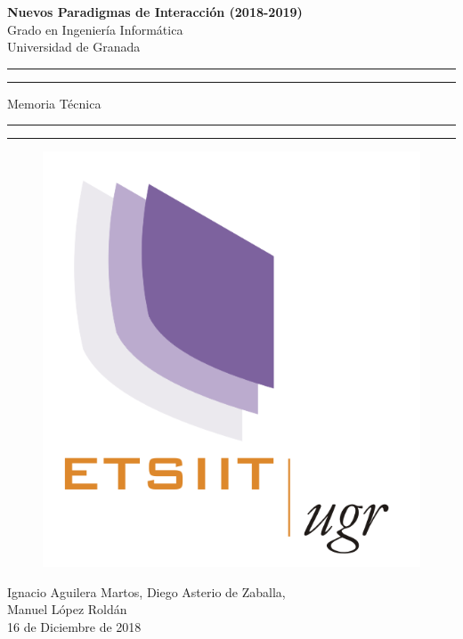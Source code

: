 \documentclass[a4paper,11pt]{article}
\begin{document}
	\begin{center}
		\LARGE{\textbf{Nuevos Paradigmas de Interacción (2018-2019)} \\ Grado en Ingeniería Informática \\ Universidad de Granada }
		\vspace*{2.5cm}

		\rule{\textwidth}{1.6pt}\vspace*{-\baselineskip}\vspace*{4pt}
		\rule{\textwidth}{1.6pt}\vspace*{-\baselineskip}\vspace*{2pt}
		\vspace{0.5cm}

		\Huge{Memoria Técnica}

		\vspace{0.5cm}
		\rule{\textwidth}{1.6pt}\vspace*{-\baselineskip}\vspace*{2pt}
		\rule{\textwidth}{1.6pt}\vspace*{-\baselineskip}\vspace*{4pt}

		\vspace{2cm}

\begin{figure}[h!]
	\centering
	\includegraphics[scale=1]{./Imagenes/logo_informatica.png}
	\label{fig:logougrciencias}
\end{figure}

		\vspace{4cm}
		\LARGE{Ignacio Aguilera Martos, Diego Asterio de Zaballa,\\ Manuel López Roldán \\ 16 de Diciembre de 2018 }

	\end{center}
\end{document}
